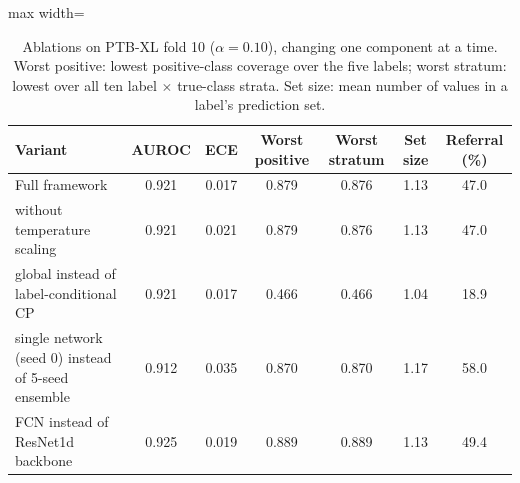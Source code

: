 \begin{table}[!t]
\centering\small
\caption{Ablations on PTB-XL fold 10 ($\alpha=0.10$), changing one component at a time. Worst positive: lowest positive-class coverage over the five labels; worst stratum: lowest over all ten label $\times$ true-class strata. Set size: mean number of values in a label's prediction set.}
\label{tab:ablations}
\setlength{\tabcolsep}{3pt}
\begin{adjustbox}{max width=\linewidth}
\begin{tabular}{lcccccc}
\toprule
Variant & AUROC & ECE & Worst positive & Worst stratum & Set size & Referral (\%) \\
\midrule
Full framework & 0.921 & 0.017 & 0.879 & 0.876 & 1.13 & 47.0 \\
without temperature scaling & 0.921 & 0.021 & 0.879 & 0.876 & 1.13 & 47.0 \\
global instead of label-conditional CP & 0.921 & 0.017 & 0.466 & 0.466 & 1.04 & 18.9 \\
single network (seed 0) instead of 5-seed ensemble & 0.912 & 0.035 & 0.870 & 0.870 & 1.17 & 58.0 \\
FCN instead of ResNet1d backbone & 0.925 & 0.019 & 0.889 & 0.889 & 1.13 & 49.4 \\
\bottomrule
\end{tabular}
\end{adjustbox}
\end{table}
